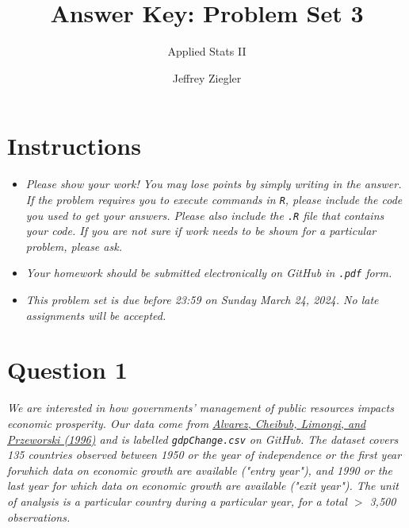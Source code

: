 \documentclass[12pt,letterpaper]{article}
\title{Answer Key: Problem Set 3}
\date{Jeffrey Ziegler}
\author{Applied Stats II}
\begin{document}
	\maketitle
	
	\section*{Instructions}
	\begin{itemize}
		\item \textit{Please show your work! You may lose points by simply writing in the answer. If the problem requires you to execute commands in \texttt{R}, please include the code you used to get your answers. Please also include the \texttt{.R} file that contains your code. If you are not sure if work needs to be shown for a particular problem, please ask.}
			\item \textit{Your homework should be submitted electronically on GitHub in \texttt{.pdf} form.}
			\item \textit{This problem set is due before 23:59 on Sunday March 24, 2024. No late assignments will be accepted.}

	\end{itemize}
	\vspace{.25cm}
	
	\section*{Question 1}
	\vspace{.25cm}
\noindent \emph{We are interested in how governments' management of public resources impacts economic prosperity. Our data come from \href{https://www.researchgate.net/profile/Adam_Przeworski/publication/240357392_Classifying_Political_Regimes/links/0deec532194849aefa000000/Classifying-Political-Regimes.pdf}{Alvarez, Cheibub, Limongi, and Przeworski (1996)} and is labelled \texttt{gdpChange.csv} on GitHub. The dataset covers 135 countries observed between 1950 or the year of independence or the first year forwhich data on economic growth are available ("entry year"), and 1990 or the last year for which data on economic growth are available ("exit year"). The unit of analysis is a particular country during a particular year, for a total $>$ 3,500 observations. }
\end{document}
